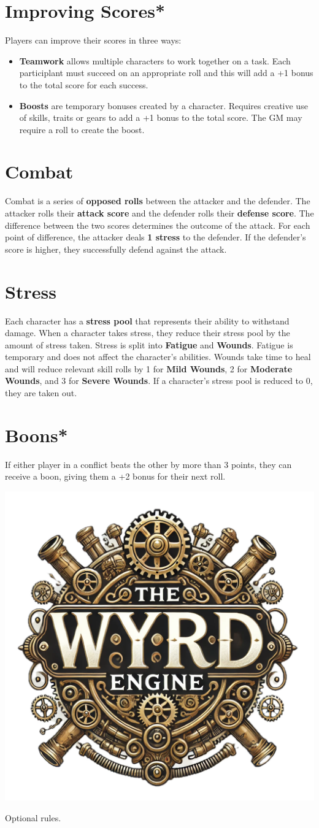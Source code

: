 \documentclass[nodeprecatedcode,bg=print]{dndbook}
\begin{document}
\begin{paracol}{2}
    \section*{Improving Scores*}
    Players can improve their scores in three ways:
    \begin{itemize}
        \item \textbf{Teamwork} allows multiple characters to work together on a task. Each participlant must succeed on an appropriate roll and this will add a +1 bonus to the total score for each success.
        \item \textbf{Boosts} are temporary bonuses created by a character. Requires creative use of skills, traits or gears to add a +1 bonus to the total score. The GM may require a roll to create the boost.
    \end{itemize}

    \switchcolumn

    \section*{Combat}
    Combat is a series of \textbf{opposed rolls} between the attacker and the defender. The attacker rolls their \textbf{attack score} and the defender rolls their \textbf{defense score}. The difference between the two scores determines the outcome of the attack. For each point of difference, the attacker deals \textbf{1 stress} to the defender. If the defender's score is higher, they successfully defend against the attack.

    \section*{Stress}
    Each character has a \textbf{stress pool} that represents their ability to withstand damage. When a character takes stress, they reduce their stress pool by the amount of stress taken. Stress is split into \textbf{Fatigue} and \textbf{Wounds}. Fatigue is temporary and does not affect the character's abilities. Wounds take time to heal and will reduce relevant skill rolls by 1 for \textbf{Mild Wounds}, 2 for \textbf{Moderate Wounds}, and 3 for \textbf{Severe Wounds}. If a character's stress pool is reduced to 0, they are taken out.

    \DamageBox[]

    \section*{Boons*}
    If either player in a conflict beats the other by more than 3 points, they can receive a boon, giving them a +2 bonus for their next roll.

\end{paracol}

\vspace*{\fill}
\begin{center}
    \includegraphics[width=.1\textwidth]{img/wyrd-logo}
\end{center}
\vspace*{\fill}

{\small * Optional rules.}
\end{document}
